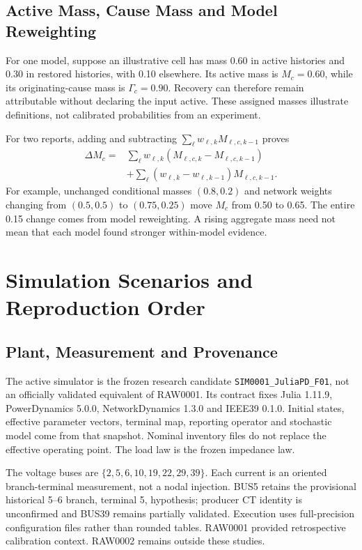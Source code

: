 \subsection{Active Mass, Cause Mass and Model Reweighting}

For one model, suppose an illustrative cell has mass 0.60 in active
histories and 0.30 in restored histories, with 0.10 elsewhere. Its active
mass is $M_c=0.60$, while its originating-cause mass is $\Gamma_c=0.90$.
Recovery can therefore remain attributable without declaring the input
active. These assigned masses illustrate definitions, not calibrated
probabilities from an experiment.

For two reports, adding and subtracting
$\sum_\ell w_{\ell,k}M_{\ell,c,k-1}$ proves
\begin{align}
 \Delta M_c={}&\sum_\ell w_{\ell,k}
       (M_{\ell,c,k}-M_{\ell,c,k-1})\nonumber\\
 &+\sum_\ell(w_{\ell,k}-w_{\ell,k-1})M_{\ell,c,k-1}.
\end{align}
For example, unchanged conditional masses $(0.8,0.2)$ and network weights
changing from $(0.5,0.5)$ to $(0.75,0.25)$ move $M_c$ from 0.50 to 0.65.
The entire 0.15 change comes from model reweighting. A rising aggregate
mass need not mean that each model found stronger within-model evidence.

\section{Simulation Scenarios and Reproduction Order}
\label{app:current-scenarios}

\subsection{Plant, Measurement and Provenance}

The active simulator is the frozen research candidate
\texttt{SIM0001\_JuliaPD\_F01}, not an officially validated equivalent of
RAW0001. Its contract fixes Julia 1.11.9, PowerDynamics 5.0.0,
NetworkDynamics 1.3.0 and IEEE39 0.1.0. Initial states, effective parameter
vectors, terminal map, reporting operator and stochastic model come from
that snapshot. Nominal inventory files do not replace the effective
operating point. The load law is the frozen impedance law.\AIDraftingCredit{}

The voltage buses are $\{2,5,6,10,19,22,29,39\}$. Each current is an
oriented branch-terminal measurement, not a nodal injection. BUS5 retains
the provisional historical 5--6 branch, terminal 5, hypothesis; producer
CT identity is unconfirmed and BUS39 remains partially validated.
Execution uses full-precision configuration files rather than rounded
tables. RAW0001 provided retrospective calibration context. RAW0002
remains outside these studies.


